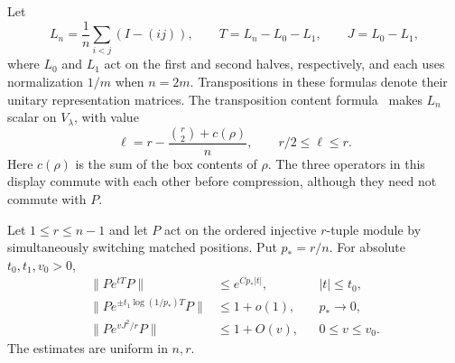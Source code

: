 Let
\[
 L_n=\frac1n\sum_{i<j}(I-(ij)),\qquad
 T=L_n-L_0-L_1,\qquad J=L_0-L_1,
\]
where $L_0$ and $L_1$ act on the first and second halves, respectively,
and each uses normalization $1/m$ when $n=2m$.  Transpositions in these
formulas denote their unitary representation matrices.
The transposition content formula~\cite{VershikOkounkov2005} makes
$L_n$ scalar on $V_\lambda$, with value
\begin{equation}\label{rec:central-level}
 \ell=r-\frac{\binom r2+c(\rho)}n,
 \qquad r/2\le\ell\le r.
\end{equation}
Here $c(\rho)$ is the sum of the box contents of $\rho$.
The three operators in this display commute with each other before
compression, although they need not commute with $P$.

\begin{lemma}\label{rec:compressed-mgfs}
Let $1\le r\le n-1$ and let $P$ act on the ordered injective
$r$-tuple module by simultaneously switching matched positions.
Put $p_*=r/n$.  For absolute
$t_0,t_1,v_0>0$,
\begin{align}
 \|Pe^{tT}P\|&\le e^{Cp_*|t|},&&|t|\le t_0,
       \label{rec:T-small-mgf}\\
 \|Pe^{\pm t_1\log(1/p_*)T}P\|&\le1+o(1),&&p_*\longrightarrow0,
       \label{rec:T-log-mgf}\\
 \|Pe^{vJ^2/r}P\|&\le1+O(v),&&0\le v\le v_0.
       \label{rec:J-square-mgf}
\end{align}
The estimates are uniform in $n,r$.
\end{lemma}
